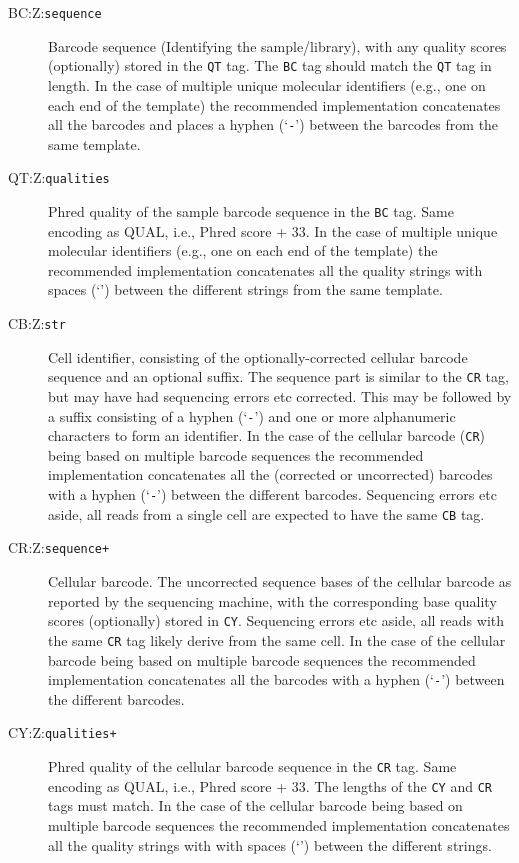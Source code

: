 \documentclass[10pt]{article}
\newcommand{\tagvalue}[1]{\tt #1}
\begin{document}
\begin{description}
\item[BC:Z:\tagvalue{sequence}]
Barcode sequence (Identifying the sample/library), with any quality scores (optionally) stored in the {\tt QT} tag.
The {\tt BC} tag should match the {\tt QT} tag in length. 
In the case of multiple unique molecular identifiers (e.g., one on each end of the template) the recommended implementation concatenates all the barcodes and places a hyphen (`{\tt -}') between the barcodes from the same template. 

\item[QT:Z:\tagvalue{qualities}] 
Phred quality of the sample barcode sequence in the {\tt BC} tag.
Same encoding as {\sf QUAL}, i.e., Phred score + 33.
In the case of multiple unique molecular identifiers (e.g., one on each end of the template) the recommended implementation concatenates all the quality strings with spaces (`{\tt \textvisiblespace}') between the different strings from the same template. 

\item[CB:Z:\tagvalue{str}]
Cell identifier, consisting of the optionally-corrected cellular barcode sequence and an optional suffix.
The sequence part is similar to the {\tt CR} tag, but may have had sequencing errors etc corrected.
This may be followed by a suffix consisting of a hyphen (`{\tt -}') and one or more alphanumeric characters to form an identifier.
In the case of the cellular barcode ({\tt CR}) being based on multiple barcode sequences the recommended implementation concatenates all the (corrected or uncorrected) barcodes with a hyphen (`{\tt -}') between the different barcodes.
Sequencing errors etc aside, all reads from a single cell are expected to have the same {\tt CB} tag.

\item[CR:Z:\tagvalue{sequence+}]
Cellular barcode. The uncorrected sequence bases of the cellular barcode as reported by the sequencing machine, with the corresponding base quality scores (optionally) stored in {\tt CY}.
Sequencing errors etc aside, all reads with the same {\tt CR} tag likely derive from the same cell.
In the case of the cellular barcode being based on multiple barcode sequences the recommended implementation concatenates all the barcodes with a hyphen (`{\tt -}') between the different barcodes.

\item[CY:Z:\tagvalue{qualities+}]
Phred quality of the cellular barcode sequence in the {\tt CR} tag.
Same encoding as {\sf QUAL}, i.e., Phred score + 33.
The lengths of the {\tt CY} and {\tt CR} tags must match.
In the case of the cellular barcode being based on multiple barcode sequences the recommended implementation concatenates all the quality strings with with spaces (`{\tt \textvisiblespace}') between the different strings.


\end{description}
\end{document}
